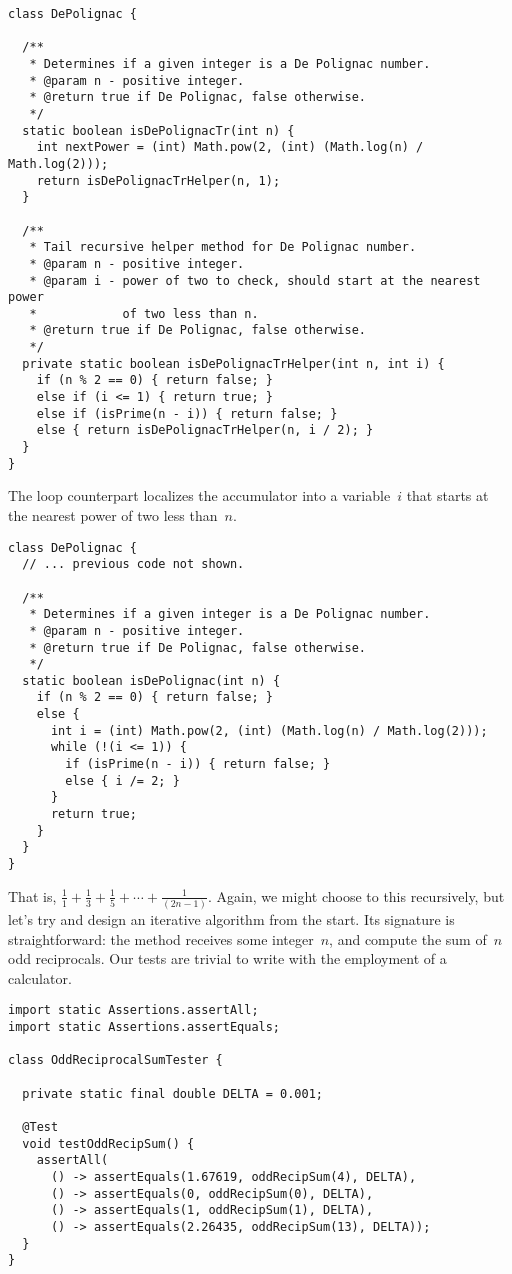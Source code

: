 \begin{lstlisting}[language=MyJava]
class DePolignac {
  
  /**
   * Determines if a given integer is a De Polignac number.
   * @param n - positive integer.
   * @return true if De Polignac, false otherwise.
   */
  static boolean isDePolignacTr(int n) {
    int nextPower = (int) Math.pow(2, (int) (Math.log(n) / Math.log(2)));
    return isDePolignacTrHelper(n, 1);
  }
  
  /**
   * Tail recursive helper method for De Polignac number.
   * @param n - positive integer.
   * @param i - power of two to check, should start at the nearest power
   *            of two less than n.
   * @return true if De Polignac, false otherwise.
   */
  private static boolean isDePolignacTrHelper(int n, int i) {
    if (n % 2 == 0) { return false; }
    else if (i <= 1) { return true; }
    else if (isPrime(n - i)) { return false; }
    else { return isDePolignacTrHelper(n, i / 2); }
  }
}
\end{lstlisting}

The loop counterpart localizes the accumulator into a variable~$i$ that starts at the nearest power of two less than~$n$.

\begin{lstlisting}[language=MyJava]
class DePolignac {
  // ... previous code not shown.

  /**
   * Determines if a given integer is a De Polignac number.
   * @param n - positive integer.
   * @return true if De Polignac, false otherwise.
   */
  static boolean isDePolignac(int n) {
    if (n % 2 == 0) { return false; }
    else {
      int i = (int) Math.pow(2, (int) (Math.log(n) / Math.log(2)));
      while (!(i <= 1)) {
        if (isPrime(n - i)) { return false; }
        else { i /= 2; }
      }
      return true;
    }
  }
}
\end{lstlisting}

That is, $\frac{1}{1} + \frac{1}{3} + \frac{1}{5} + \cdots + \frac{1}{(2n-1)}$. 
Again, we might choose to this recursively, but let's try and design an iterative algorithm from the start.
Its signature is straightforward: the method receives some integer~$n$, and compute the sum of~$n$ odd reciprocals. 
Our tests are trivial to write with the employment of a calculator.

\begin{lstlisting}[language=MyJava]
import static Assertions.assertAll;
import static Assertions.assertEquals;

class OddReciprocalSumTester {

  private static final double DELTA = 0.001;

  @Test
  void testOddRecipSum() {
    assertAll(
      () -> assertEquals(1.67619, oddRecipSum(4), DELTA),
      () -> assertEquals(0, oddRecipSum(0), DELTA),
      () -> assertEquals(1, oddRecipSum(1), DELTA),
      () -> assertEquals(2.26435, oddRecipSum(13), DELTA));
  }
}
\end{lstlisting}

